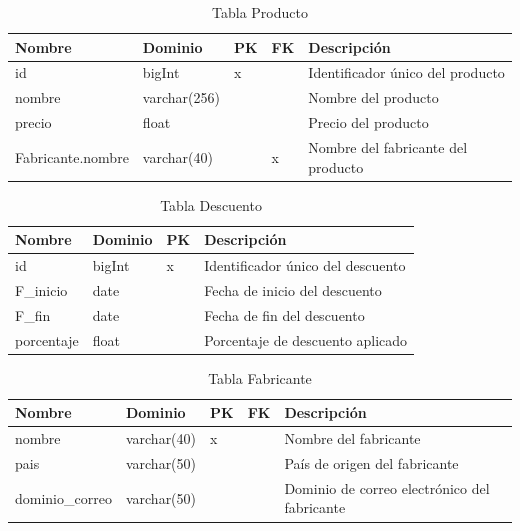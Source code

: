 \documentclass[10pt, a4paper,openany]{report}
\begin{document}
\begin{table}[h]
	\centering
	\begin{tabular}{|l|p{2cm}|p{0.5cm}|p{0.5cm}|p{3cm}|}
		\hline
		\textbf{Nombre}   & \textbf{Dominio} & \textbf{PK}& \textbf{FK} & \textbf{Descripción}               \\
		\hline
		id                & bigInt           & x        &   & Identificador único del producto   \\
		\hline
		nombre            & varchar(256)     &          &   & Nombre del producto                \\
		\hline
		precio            & float            &          &   & Precio del producto                \\
		\hline
		Fabricante.nombre & varchar(40)      &          &x   & Nombre del fabricante del producto \\
		\hline
	\end{tabular}
	\caption{Tabla Producto}
\end{table}

\begin{table}[h]
	\centering
	\begin{tabular}{|l|p{1.5cm}|p{0.5cm}|p{3cm}|}
		\hline
		\textbf{Nombre} & \textbf{Dominio} & \textbf{PK} & \textbf{Descripción}              \\
		\hline
		id              & bigInt           & x           & Identificador único del descuento \\
		\hline
		F\_inicio       & date             &             & Fecha de inicio del descuento     \\
		\hline
		F\_fin          & date             &             & Fecha de fin del descuento        \\
		\hline
		porcentaje      & float            &             & Porcentaje de descuento aplicado  \\
		\hline
	\end{tabular}
	\caption{Tabla Descuento}
\end{table}

\begin{table}[h]
\centering
\begin{tabular}{|l|p{2cm}|p{0.5cm}|p{0.5cm}|p{3cm}|}
\hline
\textbf{Nombre} &
\textbf{Dominio} &
\textbf{PK} &
\textbf{FK} &
\textbf{Descripción} \\
\hline
nombre & varchar(40) & x & & Nombre del fabricante \\
\hline
pais & varchar(50) & & & País de origen del fabricante \\
\hline
dominio\_correo & varchar(50) & & & Dominio de correo electrónico del fabricante \\
\hline
\end{tabular}
\caption{Tabla Fabricante}
\end{table}
\end{document}
